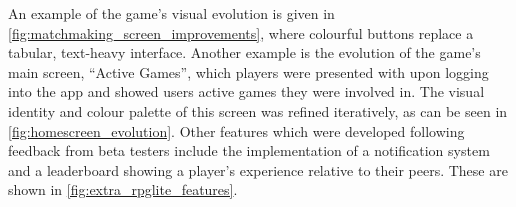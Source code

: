 



An example of the game's visual evolution is given in
\cref{fig:matchmaking_screen_improvements}, where colourful buttons replace a
tabular, text-heavy interface. Another example is the evolution of the game's
main screen, ``Active Games'', which players were presented with upon logging
into the app and showed users active games they were involved in. The visual
identity and colour palette of this screen was refined iteratively, as can be
seen in \cref{fig:homescreen_evolution}. Other features which were developed
following feedback from beta testers include the implementation of a
notification system and a leaderboard showing a player's experience relative to
their peers. These are shown in \cref{fig:extra_rpglite_features}.


